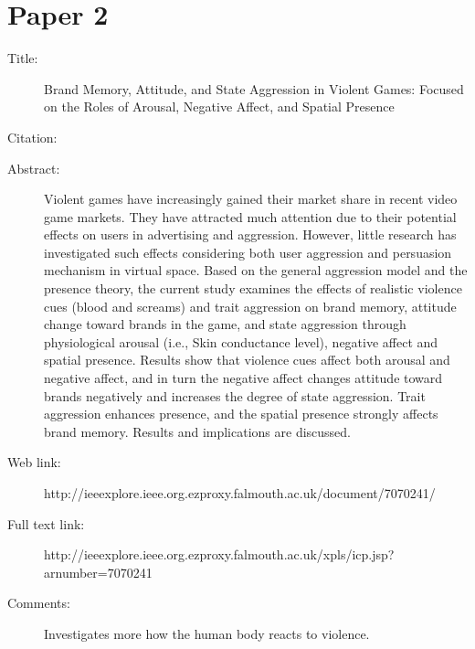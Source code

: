 \documentclass{scrartcl}
\begin{document}
\section*{Paper 2}
\begin{description}
\item[Title:] Brand Memory, Attitude, and State Aggression in Violent Games: Focused on the Roles of Arousal, Negative Affect, and Spatial Presence
\item[Citation:] \cite{brand}
\item[Abstract:] Violent games have increasingly gained their market share in recent video game markets. They have attracted much attention due to their potential effects on users in advertising and aggression. However, little research has investigated such effects considering both user aggression and persuasion mechanism in virtual space. Based on the general aggression model and the presence theory, the current study examines the effects of realistic violence cues (blood and screams) and trait aggression on brand memory, attitude change toward brands in the game, and state aggression through physiological arousal (i.e., Skin conductance level), negative affect and spatial presence. Results show that violence cues affect both arousal and negative affect, and in turn the negative affect changes attitude toward brands negatively and increases the degree of state aggression. Trait aggression enhances presence, and the spatial presence strongly affects brand memory. Results and implications are discussed.
\item[Web link:] http://ieeexplore.ieee.org.ezproxy.falmouth.ac.uk/document/7070241/
\item[Full text link:] http://ieeexplore.ieee.org.ezproxy.falmouth.ac.uk/xpls/icp.jsp?arnumber=7070241
\item[Comments:] Investigates more how the human body reacts to violence. 
\end{description}
\end{document}
